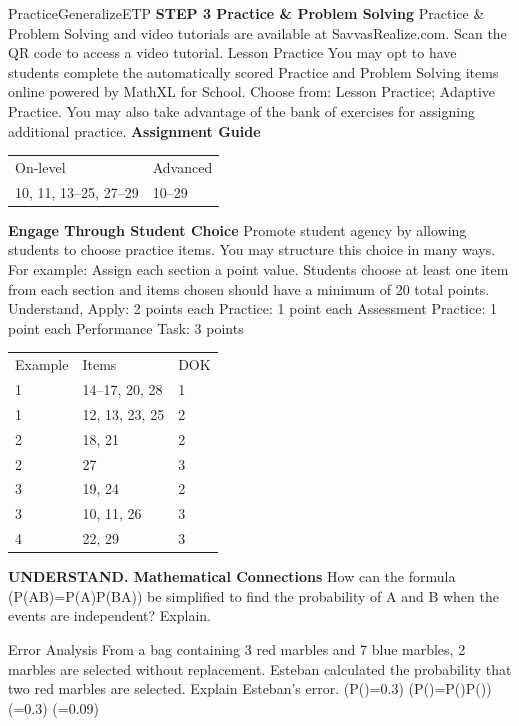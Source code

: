 \documentclass{article}
\newenvironment{item-analysis}{}{}      %
\newenvironment{practice}[2]{}{}        %
\newenvironment{te-addendum}[2]{}{}     %
\newcommand{\answer}[1]{}               %
\newcommand{\te}[1]{}                   %
\begin{document}
\begin{te-addendum}{Practice}{GeneralizeETP}
\textbf{STEP 3 Practice \& Problem Solving}
Practice \& Problem Solving and video tutorials are available at SavvasRealize.com. Scan the QR code to access a video tutorial.
Lesson Practice You may opt to have students complete the automatically scored Practice and Problem Solving items online powered by MathXL for School.
Choose from: Lesson Practice; Adaptive Practice.
You may also take advantage of the bank of exercises for assigning additional practice.
\textbf{Assignment Guide}
\begin{tabular}{ll}
On-level & Advanced \\
10, 11, 13--25, 27--29 & 10--29 \\
\end{tabular}
\textbf{Engage Through Student Choice}
Promote student agency by allowing students to choose practice items.
You may structure this choice in many ways. For example:
Assign each section a point value. Students choose at least one item from each section and items chosen should have a minimum of 20 total points.
Understand, Apply: 2 points each
Practice: 1 point each
Assessment Practice: 1 point each
Performance Task: 3 points
\end{te-addendum}
\begin{item-analysis}
\begin{tabular}{lll}
Example & Items & DOK \\
1 & 14--17, 20, 28 & 1 \\
1 & 12, 13, 23, 25 & 2 \\
2 & 18, 21 & 2 \\
2 & 27 & 3 \\
3 & 19, 24 & 2 \\
3 & 10, 11, 26 & 3 \\
4 & 22, 29 & 3 \\
\end{tabular}
\end{item-analysis}
\begin{practice}{10}{3}
\textbf{UNDERSTAND. Mathematical Connections} How can the formula (P(AB)=P(A)\cdot P(B\mid A)) be simplified to find the probability of A and B when the events are independent? Explain.
\answer{When A and B are independent, (P(B\mid A)=P(B)). Then the formula (P(A\text{ and }B)=P(A)\cdot P(B\mid A)) simplifies to (P(A\text{ and }B)=P(A)\cdot P(B)), which is true when events A and B are independent.}
\end{practice}
\begin{practice}{11}{3}
Error Analysis From a bag containing 3 red marbles and 7 blue marbles, 2 marbles are selected without replacement. Esteban calculated the probability that two red marbles are selected. Explain Esteban's error.
(P()=0.3)
(P()=P()\cdot P())
(=0.3)
(=0.09)
\te{Erroneous work marked with red X.}
\answer{The events are not independent, so (P(\text{red second}\mid\text{red first})) is not the same as (P(\text{red first})). (P(\text{red second and red first})=P(\text{red first})\cdot P(\text{red second}\mid\text{red first})=\frac3{10}\cdot\frac29\approx0.067).}
\end{practice}
\end{document}
